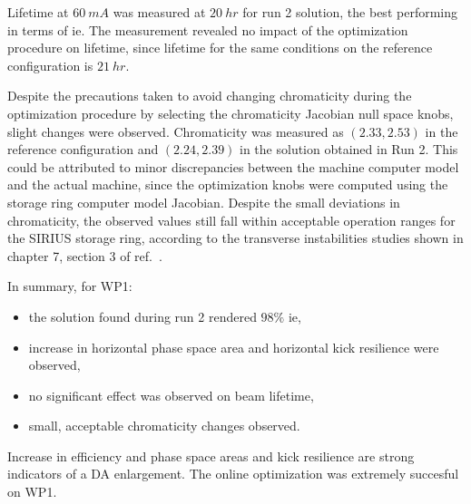 Lifetime at $60~\unit{mA}$ was measured at $20~\unit{hr}$ for run 2 solution, the best performing in terms of \gls*{ie}. The measurement revealed no impact of the optimization procedure on lifetime, since lifetime for the same conditions on the reference configuration is $21~\unit{hr}$.

Despite the precautions taken to avoid changing chromaticity during the optimization procedure by selecting the chromaticity Jacobian null space knobs, slight changes were observed. Chromaticity was measured as $(2.33, 2.53)$ in the reference configuration and $(2.24, 2.39)$ in the solution obtained in Run 2. This could be attributed to minor discrepancies between the machine computer model and the actual machine, since the optimization knobs were computed using the storage ring computer model Jacobian. Despite the small deviations in chromaticity, the observed values still fall within acceptable operation ranges for the SIRIUS storage ring, according to the transverse instabilities studies shown in chapter 7, section 3 of ref.~\cite{sa_study_2018}.

In summary, for \gls*{WP1}:
\begin{itemize}
    \item the solution found during run 2 rendered $98\%$ \gls*{ie},
    \item increase in horizontal phase space area and horizontal kick resilience were observed,
    \item no significant effect was observed on beam lifetime,
    \item small, acceptable chromaticity changes observed.
\end{itemize}
Increase in efficiency and phase space areas and kick resilience are strong indicators of a \gls*{DA} enlargement. The online optimization was extremely succesful on \gls*{WP1}.


